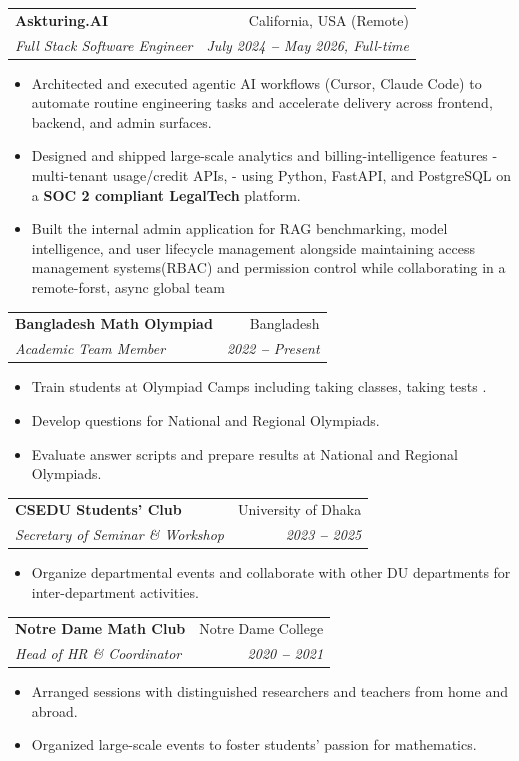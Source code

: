 \documentclass[a4paper,11pt]{article}
\makeatletter
\newcommand{\resumeItem}[1]{
  \item\small{\justifying #1 \vspace{-2pt}}
}
\newcommand{\resumeSubheading}[4]{
  \vspace{-2pt}\item
    \begin{tabular*}{0.97\textwidth}[t]{l@{\extracolsep{\fill}}r}
      \textbf{#1} & #2 \\
      \textit{\small#3} & \textit{\small #4} \\
    \end{tabular*}\vspace{-7pt}
}
\newcommand{\resumeItemListStart}{\begin{itemize}}
\newcommand{\resumeItemListEnd}{\end{itemize}\vspace{-5pt}}
\makeatother
\begin{document}
\resumeSubheading
  {Askturing.AI}{California, USA (Remote)}
  {Full Stack Software Engineer}{July 2024 \textbf{--} May 2026, Full-time}
  \resumeItemListStart
    \resumeItem{Architected and executed agentic AI workflows (Cursor, Claude Code) to automate routine engineering tasks and accelerate delivery across frontend, backend, and admin surfaces.}
    \resumeItem{Designed and shipped large-scale analytics and billing-intelligence features - multi-tenant usage/credit APIs, - using Python, FastAPI, and PostgreSQL on a \textbf{SOC 2 compliant LegalTech} platform.}
    \resumeItem{Built the internal admin application for RAG benchmarking, model intelligence, and user lifecycle management alongside maintaining access management systems(RBAC) and permission control while collaborating in a remote-forst, async global team}
  \resumeItemListEnd


\resumeSubheading
  {Bangladesh Math Olympiad}{Bangladesh}
  {Academic Team Member}{2022 \textbf{--} Present}
  \resumeItemListStart
    \resumeItem{Train students at Olympiad Camps including taking classes, taking tests .}
    \resumeItem{Develop questions for National and Regional Olympiads.}
    \resumeItem{Evaluate answer scripts and prepare results at National and Regional Olympiads.}
  \resumeItemListEnd

\resumeSubheading
  {CSEDU Students' Club}{University of Dhaka}
  {Secretary of Seminar \& Workshop}{2023 \textbf{--} 2025}
  \resumeItemListStart
    \resumeItem{Organize departmental events and collaborate with other DU departments for inter-department activities.}
  \resumeItemListEnd

\resumeSubheading
  {Notre Dame Math Club}{Notre Dame College}
  {Head of HR \& Coordinator}{2020 \textbf{--} 2021}
  \resumeItemListStart
    \resumeItem{Arranged sessions with distinguished researchers and teachers from home and abroad.}
    \resumeItem{Organized large-scale events to foster students' passion for mathematics.}
  \resumeItemListEnd
\end{document}
